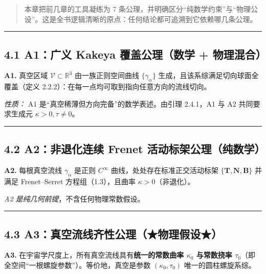 \begin{quote}
本章把前几章的工具凝练为 7
条公理，并明确区分``纯数学约束''与``物理公设''。这是全书逻辑清晰的原点：任何结论都可追溯到它依赖哪几条公理。
\end{quote}

\begin{center}\rule{0.5\linewidth}{0.5pt}\end{center}

\subsection{4.1 A1：广义 Kakeya 覆盖公理（数学 +
物理混合）}\label{a1ux5e7fux4e49-kakeya-ux8986ux76d6ux516cux7406ux6570ux5b66-ux7269ux7406ux6df7ux5408}

\textbf{A1.} 真空区域 \(\mathcal{V}\subset\mathbb{R}^3\)
由一族正则空间曲线 \(\{\gamma_\alpha\}\)
生成，且该系综满足切向球面全覆盖（定义
2.2.2）：在每一点均可取到指向任意方向的流线切向。

\emph{性质：} A1 是``真空稀薄但方向完备''的数学表述。由引理 2.4.1，A1 与
A2 共同要求生成元 \(\kappa>0,\tau\neq0\)。

\begin{center}\rule{0.5\linewidth}{0.5pt}\end{center}

\subsection{4.2 A2：非退化连续 Frenet
活动标架公理（纯数学）}\label{a2ux975eux9000ux5316ux8fdeux7eed-frenet-ux6d3bux52a8ux6807ux67b6ux516cux7406ux7eafux6570ux5b66}

\textbf{A2.} 每根真空流线 \(\gamma_\alpha\) 是正则 \(C^\infty\)
曲线，处处存在标准正交活动标架 \(\{\mathbf{T},\mathbf{N},\mathbf{B}\}\)
并满足 Frenet--Serret 方程组（1.3），且曲率 \(\kappa>0\)（非退化）。

\emph{A2 是纯几何前提}，不含任何物理常数假设。

\begin{center}\rule{0.5\linewidth}{0.5pt}\end{center}

\subsection{4.3
A3：真空流线齐性公理（★物理假设★）}\label{a3ux771fux7a7aux6d41ux7ebfux9f50ux6027ux516cux7406ux7269ux7406ux5047ux8bbe}

\textbf{A3.} 在宇宙学尺度上，所有真空流线具有\textbf{统一的常数曲率
\(\kappa_0\) 与常数挠率
\(\tau_0\)}（即全空间``一根螺旋参数''）。等价地，真空是参数
\((\kappa_0,\tau_0)\) 唯一的圆柱螺旋系综。

